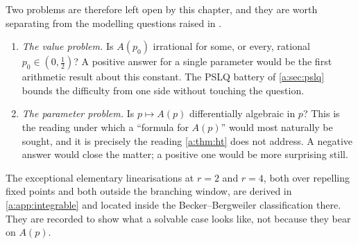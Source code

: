 Two problems are therefore left open by this chapter, and they are worth separating
from the modelling questions raised in \ChM.

\begin{enumerate}[leftmargin=*]
\item \emph{The value problem.} Is $A(p_0)$ irrational for some, or every, rational
      $p_0\in(0,\tfrac12)$? A positive answer for a single parameter would be the
      first arithmetic result about this constant. The PSLQ battery of
      \cref{a:sec:pslq} bounds the difficulty from one side without touching the
      question.
\item \emph{The parameter problem.} Is $p\mapsto A(p)$ differentially algebraic in
      $p$? This is the reading under which a ``formula for $A(p)$'' would most
      naturally be sought, and it is precisely the reading \cref{a:thm:ht} does not
      address. A negative answer would close the matter; a positive one would be
      more surprising still.
\end{enumerate}

The exceptional elementary linearisations at $r=2$ and $r=4$, both over repelling
fixed points and both outside the branching window, are derived in
\cref{a:app:integrable} and located inside the Becker--Bergweiler classification
there. They are recorded to show what a solvable case looks like, not because they
bear on $A(p)$.
